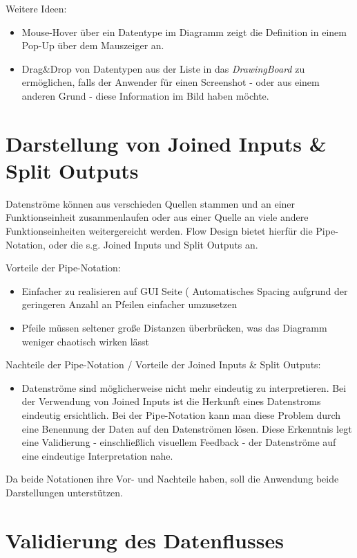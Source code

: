 Weitere Ideen: 
\begin{itemize}
\item Mouse-Hover über ein Datentype im Diagramm zeigt die Definition in einem Pop-Up
über dem Mauszeiger an.
\item Drag\&Drop von Datentypen aus der Liste in das \textit{DrawingBoard} zu
ermöglichen, falls der Anwender für einen Screenshot - oder aus einem anderen
Grund - diese Information im Bild haben möchte.
\end{itemize}


\section{Darstellung von Joined Inputs \& Split Outputs}

Datenströme können aus verschieden Quellen stammen und an einer Funktionseinheit
zusammenlaufen oder aus einer Quelle an viele andere Funktionseinheiten weitergereicht werden. Flow Design bietet hierfür die Pipe-Notation, oder die s.g. Joined Inputs und Split Outputs an. 

\bigskip

Vorteile der Pipe-Notation:

\begin{itemize}
\item Einfacher zu realisieren auf GUI Seite ( Automatisches Spacing aufgrund der
geringeren Anzahl an Pfeilen einfacher umzusetzen
\item Pfeile müssen seltener große Distanzen überbrücken, was das Diagramm weniger
chaotisch wirken lässt
\end{itemize}

Nachteile der Pipe-Notation / Vorteile der Joined Inputs \& Split Outputs:

\begin{itemize}
\item Datenströme sind möglicherweise nicht mehr eindeutig zu interpretieren. 
Bei der Verwendung von Joined Inputs ist die Herkunft eines Datenstroms eindeutig
ersichtlich. Bei der Pipe-Notation kann man diese Problem durch eine Benennung der Daten auf den Datenströmen lösen. Diese Erkenntnis legt eine Validierung - einschließlich visuellem Feedback - der Datenströme auf eine eindeutige Interpretation nahe.
\end{itemize}

Da beide Notationen ihre Vor- und Nachteile haben, soll die Anwendung beide Darstellungen unterstützen.

\section{Validierung des Datenflusses}

